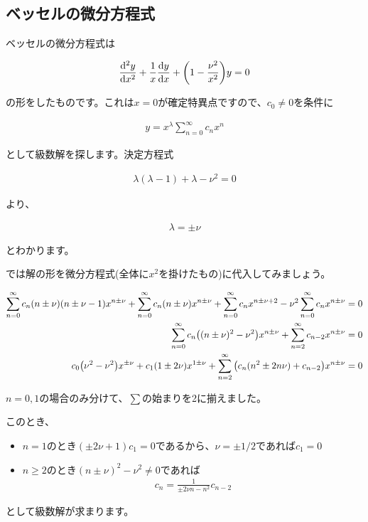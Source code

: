 \subsection{ベッセルの微分方程式}
\label{vessel}
ベッセルの微分方程式は

\begin{eqnarray}
    \frac{\dd^2 y}{\dd x^2}+\frac{1}{x}\frac{\dd y}{\dd x}+\pqty{1-\frac{\nu^2}{x^2}}y=0
\end{eqnarray}

\noindent
の形をしたものです。これは$x=0$が確定特異点ですので、$c_0\neq0$を条件に

\begin{eqnarray}
y=x^\lambda\sum_{n=0}^\infty c_nx^n
\end{eqnarray}

\noindent
として級数解を探します。決定方程式

\begin{eqnarray}
    \lambda(\lambda-1)+\lambda-\nu^2=0
\end{eqnarray}

\noindent
より、

\begin{eqnarray}
    \lambda=\pm\nu
\end{eqnarray}

\noindent
とわかります。

では解の形を微分方程式(全体に$x^2$を掛けたもの)に代入してみましょう。

\begin{eqnarray}
    \sum_{n=0}^\infty c_n(n\pm\nu)(n\pm\nu-1)x^{n\pm\nu}+\sum_{n=0}^\infty c_n(n\pm\nu)x^{n\pm\nu}+\sum_{n=0}^\infty c_nx^{n\pm\nu+2}-\nu^2\sum_{n=0}^\infty c_nx^{n\pm\nu}=0 \\
    \sum_{n=0}^\infty c_n\pqty{(n\pm\nu)^2-\nu^2}x^{n\pm\nu}+\sum_{n=2}^\infty c_{n-2}x^{n\pm\nu}=0 \nonumber \\
    c_0\pqty{\nu^2-\nu^2}x^{\pm\nu}+c_1\pqty{1\pm2\nu}x^{1\pm\nu}+\sum_{n=2}^\infty \pqty{c_n(n^2\pm2n\nu)+c_{n-2}}x^{n\pm\nu}=0
\end{eqnarray}

$n=0,1$の場合のみ分けて、$\sum$の始まりを2に揃えました。

このとき、

\begin{itemize}
    \item $n=1$のとき$(\pm2\nu+1)c_1=0$であるから、$\nu=\pm1/2$であれば$c_1=0$
    \item $n\geq2$のとき$(n\pm\nu)^2-\nu^2\neq0$であれば
    \begin{eqnarray}
    c_n=\frac{1}{\pm2\nu n-n^2}c_{n-2}
    \end{eqnarray}
\end{itemize}

として級数解が求まります。


\clearpage